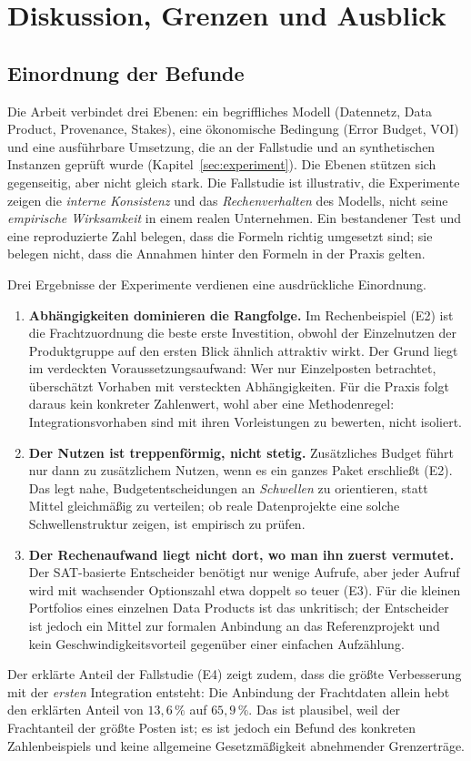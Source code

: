 \documentclass[a4paper,12pt,twoside]{report}
\theoremstyle{definition}
\begin{document}
\chapter{Diskussion, Grenzen und Ausblick}
\label{sec:discussion}

\section{Einordnung der Befunde}
Die Arbeit verbindet drei Ebenen: ein begriffliches Modell (Datennetz, Data Product, Provenance, Stakes), eine ökonomische Bedingung (Error Budget, VOI) und eine ausführbare Umsetzung, die an der Fallstudie und an synthetischen Instanzen geprüft wurde (Kapitel~\ref{sec:experiment}). Die Ebenen stützen sich gegenseitig, aber nicht gleich stark. Die Fallstudie ist illustrativ, die Experimente zeigen die \emph{interne Konsistenz} und das \emph{Rechenverhalten} des Modells, nicht seine \emph{empirische Wirksamkeit} in einem realen Unternehmen. Ein bestandener Test und eine reproduzierte Zahl belegen, dass die Formeln richtig umgesetzt sind; sie belegen nicht, dass die Annahmen hinter den Formeln in der Praxis gelten.

Drei Ergebnisse der Experimente verdienen eine ausdrückliche Einordnung.
\begin{enumerate}
\item \textbf{Abhängigkeiten dominieren die Rangfolge.} Im Rechenbeispiel (E2) ist die Frachtzuordnung die beste erste Investition, obwohl der Einzelnutzen der Produktgruppe auf den ersten Blick ähnlich attraktiv wirkt. Der Grund liegt im verdeckten Voraussetzungsaufwand: Wer nur Einzelposten betrachtet, überschätzt Vorhaben mit versteckten Abhängigkeiten. Für die Praxis folgt daraus kein konkreter Zahlenwert, wohl aber eine Methodenregel: Integrationsvorhaben sind mit ihren Vorleistungen zu bewerten, nicht isoliert.
\item \textbf{Der Nutzen ist treppenförmig, nicht stetig.} Zusätzliches Budget führt nur dann zu zusätzlichem Nutzen, wenn es ein ganzes Paket erschließt (E2). Das legt nahe, Budgetentscheidungen an \emph{Schwellen} zu orientieren, statt Mittel gleichmäßig zu verteilen; ob reale Datenprojekte eine solche Schwellenstruktur zeigen, ist empirisch zu prüfen.
\item \textbf{Der Rechenaufwand liegt nicht dort, wo man ihn zuerst vermutet.} Der SAT-basierte Entscheider benötigt nur wenige Aufrufe, aber jeder Aufruf wird mit wachsender Optionszahl etwa doppelt so teuer (E3). Für die kleinen Portfolios eines einzelnen Data Products ist das unkritisch; der Entscheider ist jedoch ein Mittel zur formalen Anbindung an das Referenzprojekt und kein Geschwindigkeitsvorteil gegenüber einer einfachen Aufzählung.
\end{enumerate}
Der erklärte Anteil der Fallstudie (E4) zeigt zudem, dass die größte Verbesserung mit der \emph{ersten} Integration entsteht: Die Anbindung der Frachtdaten allein hebt den erklärten Anteil von $13{,}6\,\%$ auf $65{,}9\,\%$. Das ist plausibel, weil der Frachtanteil der größte Posten ist; es ist jedoch ein Befund des konkreten Zahlenbeispiels und keine allgemeine Gesetzmäßigkeit abnehmender Grenzerträge.
\end{document}

